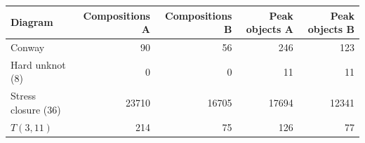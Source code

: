 \begin{tabular}{lrrrr}
\toprule
Diagram & Compositions A & Compositions B & Peak objects A & Peak objects B \\
\midrule
Conway & 90 & 56 & 246 & 123 \\
Hard unknot (8) & 0 & 0 & 11 & 11 \\
Stress closure (36) & 23710 & 16705 & 17694 & 12341 \\
$T(3,11)$ & 214 & 75 & 126 & 77 \\
\bottomrule
\end{tabular}
